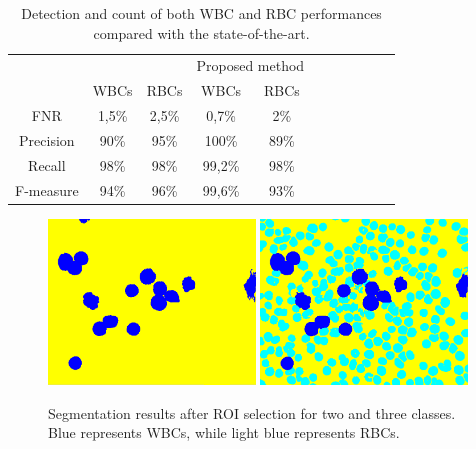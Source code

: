 {	\begin{table}[h]
		\centering\tabcolsep=1mm
		\begin{tabular}{ccccccccccc}
			\hline
			&\multicolumn{2}{c}{\cite{Alomari}} 	&\multicolumn{2}{c}{Proposed method}\\
			& 	WBCs 		& RBCs 						&	WBCs 		& 	RBCs \\
			\hline
			FNR			&	1,5\% 		&  2,5\%					&	0,7\% 		&  2\%\\
			Precision &	90\% 		&  95\% 					&	100\% 		&  89\%\\
			Recall		& 	98\% 		&  98\% 					&	 99,2\% 	&  98\%\\
			F-measure 	& 	94\% 		&  96\%						&	 99,6\% 	&  93\%\\
			\hline
		\end{tabular} 
		\caption[Comparison of detection and count with state-of-the-art.]{Detection and count of both WBC and RBC performances compared with the state-of-the-art.}
		\label{tab:table2}
	\end{table}
	
	\begin{figure}[h]
		\centering
		\includegraphics[width=0.49\textwidth]{images/2015_1_caip/ROI4}
		\includegraphics[width=0.49\textwidth]{images/2015_1_caip/ROI5}
		\caption[Segmentation results after ROI selection.]{\label{fig:ex7}Segmentation results after ROI selection for two and three classes. Blue represents WBCs, while light blue represents RBCs.}
	\end{figure}
	
}
